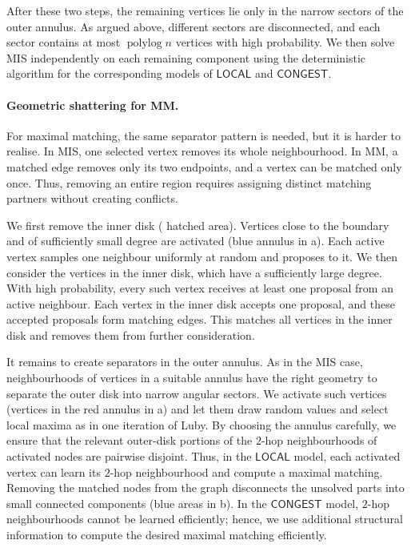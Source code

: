 \documentclass[letterpaper,11pt]{article}
\newcommand{\1}{\mathbb I}
\DeclareMathOperator{\polylog}{polylog}
\newcommand{\CONGEST}{\ensuremath{\mathsf{CONGEST}}\xspace}
\newcommand{\LOCAL}{\ensuremath{\mathsf{LOCAL}}\xspace}
\begin{document}
After these two steps, the remaining vertices lie only in the narrow sectors of the outer annulus. As argued above, different sectors are disconnected, and each sector contains at most $\polylog n$ vertices with high probability. We then solve MIS independently on each remaining component using the deterministic algorithm for the corresponding models of \LOCAL and \CONGEST.

\paragraph{Geometric shattering for MM.}

For maximal matching, the same separator pattern is needed, but it is harder to realise. In MIS, one selected vertex removes its whole neighbourhood. In MM, a matched edge removes only its two endpoints, and a vertex can be matched only once. Thus, removing an entire region requires assigning distinct matching partners without creating conflicts.

We first remove the inner disk ( hatched area). Vertices close to the boundary and of sufficiently small degree are activated (blue annulus in a). Each active vertex samples one neighbour uniformly at random and proposes to it. We then consider the vertices in the inner disk, which have a sufficiently large degree. With high probability, every such vertex receives at least one proposal from an active neighbour. Each vertex in the inner disk accepts one proposal, and these accepted proposals form matching edges. This matches all vertices in the inner disk and removes them from further consideration.

It remains to create separators in the outer annulus. As in the MIS case, neighbourhoods of vertices in a suitable annulus have the right geometry to separate the outer disk into narrow angular sectors. We activate such vertices (vertices in the red annulus in a) and let them draw random values and select local maxima as in one iteration of Luby. By choosing the annulus carefully, we ensure that the relevant outer-disk portions of the $2$-hop neighbourhoods of activated nodes are pairwise disjoint. Thus, in the \LOCAL model, each activated vertex can learn its $2$-hop neighbourhood and compute a maximal matching. Removing the matched nodes from the graph disconnects the unsolved parts into small connected components (blue areas in b). In the \CONGEST model, $2$-hop neighbourhoods cannot be learned efficiently; hence, we use additional structural information to compute the desired maximal matching efficiently. 
%
\end{document}
